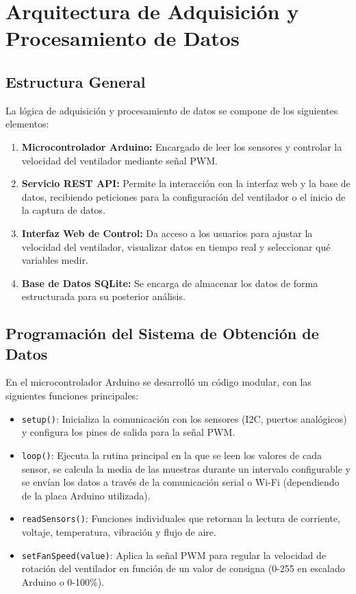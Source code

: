 \section{Arquitectura de Adquisición y Procesamiento de Datos}
\subsection{Estructura General}
La lógica de adquisición y procesamiento de datos se compone de los siguientes elementos:
\begin{enumerate}
    \item \textbf{Microcontrolador Arduino:} Encargado de leer los sensores y controlar la velocidad del ventilador mediante señal PWM.
    \item \textbf{Servicio REST API:} Permite la interacción con la interfaz web y la base de datos, recibiendo peticiones para la configuración del ventilador o el inicio de la captura de datos.
    \item \textbf{Interfaz Web de Control:} Da acceso a los usuarios para ajustar la velocidad del ventilador, visualizar datos en tiempo real y seleccionar qué variables medir.
    \item \textbf{Base de Datos SQLite:} Se encarga de almacenar los datos de forma estructurada para su posterior análisis.
\end{enumerate}

\subsection{Programación del Sistema de Obtención de Datos}
En el microcontrolador Arduino se desarrolló un código modular, con las siguientes funciones principales:
\begin{itemize}
    \item \texttt{setup()}: Inicializa la comunicación con los sensores (I2C, puertos analógicos) y configura los pines de salida para la señal PWM.
    \item \texttt{loop()}: Ejecuta la rutina principal en la que se leen los valores de cada sensor, se calcula la media de las muestras durante un intervalo configurable y se envían los datos a través de la comunicación serial o Wi-Fi (dependiendo de la placa Arduino utilizada).
    \item \texttt{readSensors()}: Funciones individuales que retornan la lectura de corriente, voltaje, temperatura, vibración y flujo de aire.
    \item \texttt{setFanSpeed(value)}: Aplica la señal PWM para regular la velocidad de rotación del ventilador en función de un valor de consigna (0-255 en escalado Arduino o 0-100\%).
\end{itemize}

